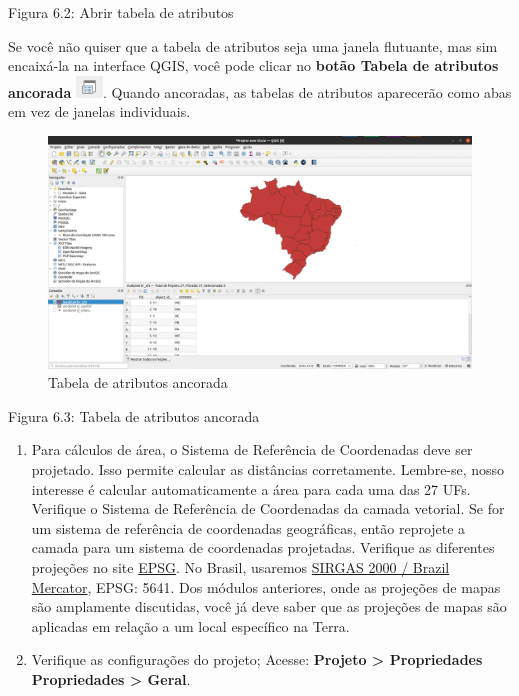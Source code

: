 \documentclass[
]{krantz}
\begin{document}
Figura 6.2: Abrir tabela de atributos

Se você não quiser que a tabela de atributos seja uma janela flutuante, mas sim encaixá-la na interface QGIS, você pode clicar no \textbf{botão Tabela de atributos ancorada} \includegraphics{media/modulo6/dock-attr-btn.png}. Quando ancoradas, as tabelas de atributos aparecerão como abas em vez de janelas individuais.

\begin{figure}
\centering
\includegraphics{media/modulo6/docked-attribute-tab.png}
\caption{Tabela de atributos ancorada}
\end{figure}

Figura 6.3: Tabela de atributos ancorada

\begin{enumerate}
\def\labelenumi{\arabic{enumi}.}
\setcounter{enumi}{2}
\item
  Para cálculos de área, o Sistema de Referência de Coordenadas deve ser projetado. Isso permite calcular as distâncias corretamente. Lembre-se, nosso interesse é calcular automaticamente a área para cada uma das 27 UFs. Verifique o Sistema de Referência de Coordenadas da camada vetorial. Se for um sistema de referência de coordenadas geográficas, então reprojete a camada para um sistema de coordenadas projetadas. Verifique as diferentes projeções no site \href{https://epsg.io/?q=Brazil+kind\%3APROJCRS}{EPSG}. No Brasil, usaremos \href{https://epsg.io/5641}{SIRGAS 2000 / Brazil Mercator}, EPSG: 5641. Dos módulos anteriores, onde as projeções de mapas são amplamente discutidas, você já deve saber que as projeções de mapas são aplicadas em relação a um local específico na Terra.
\item
  Verifique as configurações do projeto; Acesse: \textbf{Projeto \textgreater{} Propriedades Propriedades \textgreater{} Geral}.
\end{enumerate}
\end{document}
